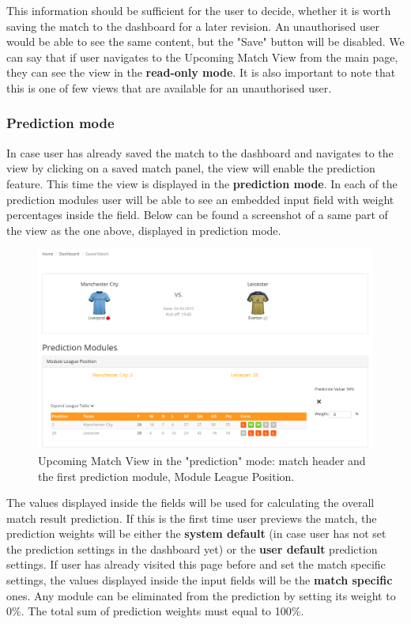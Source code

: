 This information should be sufficient for the user to decide, whether it is worth saving the match to the dashboard for a later revision. An unauthorised user would be able to see the same content, but the "Save" button will be disabled. We can say that if user navigates to the Upcoming Match View from the main page, they can see the view in the \textbf{read-only mode}. It is also important to note that this is one of few views that are available for an unauthorised user.

\subsubsection*{Prediction mode}
In case user has already saved the match to the dashboard and navigates to the view by clicking on a saved match panel, the view will enable the prediction feature. This time the view is displayed in the \textbf{prediction mode}. In each of the prediction modules user will be able to see an embedded input field with weight percentages inside the field. Below can be found a screenshot of a same part of the view as the one above, displayed in prediction mode.

\begin{figure}[H]
	\begin{center}
		\includegraphics[width=.90\linewidth,natwidth=610,natheight=642]{impl/images/upcomingMatchViewSM}
		\caption{Upcoming Match View in the "prediction" mode: match header and the first prediction module, Module League Position.} \label{fig:using:upcominmatchviewSM}
	\end{center}
\end{figure}

The values displayed inside the fields will be used for calculating the overall match result prediction. If this is the first time user previews the match, the prediction weights will be either the \textbf{system default} (in case user has not set the prediction settings in the dashboard yet) or the \textbf{user default} prediction settings. If user has already visited this page before and set the match specific settings, the values displayed inside the input fields will be the \textbf{match specific} ones. Any module can be eliminated from the prediction by setting its weight to 0\%. The total sum of prediction weights must equal to 100\%.

